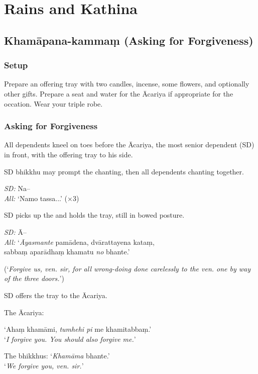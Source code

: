 \chapter{Rains and Kathina}

\section{Khamāpana-kammaṃ (Asking for Forgiveness)}

\subsection{Setup}

Prepare an offering tray with two candles, incense, some flowers, and optionally
other gifts. Prepare a seat and water for the Ācariya if appropriate for the
occation. Wear your triple robe.

\subsection{Asking for Forgiveness}

All dependents kneel on toes before the Ācariya, the most senior dependent (SD)
in front, with the offering tray to his side.


SD bhikkhu may prompt the chanting, then all dependents chanting together.

\emph{SD:} Na--\\
\emph{All:} ‘Namo tassa...’ (×3)

SD picks up the and holds the tray, still in bowed posture.

\emph{SD:} Ā--\\
\emph{All:} ‘\emph{Āyasmante} pamādena, dvārattayena kataṃ,\\ sabbaṃ aparādhaṃ khamatu \emph{no} bhante.’

(‘\emph{Forgive us, ven. sir, for all wrong-doing done carelessly to the ven. one by way of the three doors.}’)

SD offers the tray to the Ācariya.

The Ācariya:

‘Ahaṃ khamāmi, \emph{tumhehi pi} me khamitabbaṃ.’\\
‘\emph{I forgive you. You should also forgive me.}’

The bhikkhus: ‘\emph{Khamāma} bhante.’\\
‘\emph{We forgive you, ven. sir.}’

